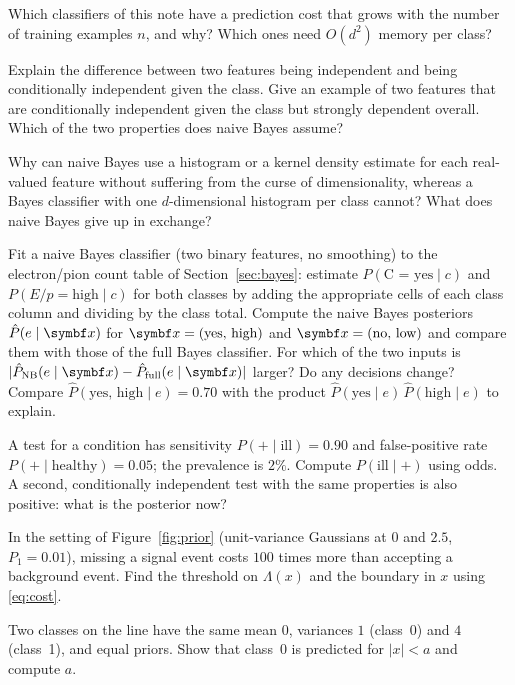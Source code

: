 \documentclass[11pt]{article}
\begin{document}
\begin{questions}
\begin{conceptual}
\item Which classifiers of this note have a prediction cost that grows with the number of training examples $n$, and
why? Which ones need $O(d^2)$ memory per class?
\item Explain the difference between two features being independent and being conditionally independent given the
class. Give an example of two features that are conditionally independent given the class but strongly dependent
overall. Which of the two properties does naive Bayes assume?
\item Why can naive Bayes use a histogram or a kernel density estimate for each real-valued feature without suffering
from the curse of dimensionality, whereas a Bayes classifier with one $d$-dimensional histogram per class cannot? What
does naive Bayes give up in exchange?
\end{conceptual}
\begin{calculations}
\item Fit a naive Bayes classifier (two binary features, no smoothing) to the electron/pion count table of
Section~\ref{sec:bayes}: estimate $P(\text{C = yes} \mid c)$ and $P(E/p = \text{high} \mid c)$ for both classes by adding
the appropriate cells of each class column and dividing by the class total. Compute the naive Bayes posteriors
$\hat P(e \mid \x)$ for $\x = (\text{yes, high})$ and $\x = (\text{no, low})$ and compare them with those of the full
Bayes classifier. For which of the two inputs is $\lvert \hat P_{\mathrm{NB}}(e \mid \x) - \hat P_{\mathrm{full}}(e \mid
\x)\rvert$ larger? Do any decisions change? Compare $\hat P(\text{yes, high} \mid e) = 0.70$ with the product
$\hat P(\text{yes} \mid e)\, \hat P(\text{high} \mid e)$ to explain.
\item A test for a condition has sensitivity $P(+ \mid \text{ill}) = 0.90$ and false-positive rate
$P(+ \mid \text{healthy}) = 0.05$; the prevalence is $2\%$. Compute $P(\text{ill} \mid +)$ using odds. A second,
conditionally independent test with the same properties is also positive: what is the posterior now?
\item In the setting of Figure~\ref{fig:prior} (unit-variance Gaussians at $0$ and $2.5$, $P_1 = 0.01$), missing a
signal event costs $100$ times more than accepting a background event. Find the threshold on $\Lambda(x)$ and the
boundary in $x$ using \eqref{eq:cost}.
\item Two classes on the line have the same mean $0$, variances $1$ (class~0) and $4$ (class~1), and equal priors. Show
that class~0 is predicted for $\lvert x\rvert < a$ and compute $a$.

\end{calculations}
\end{questions}
\end{document}
